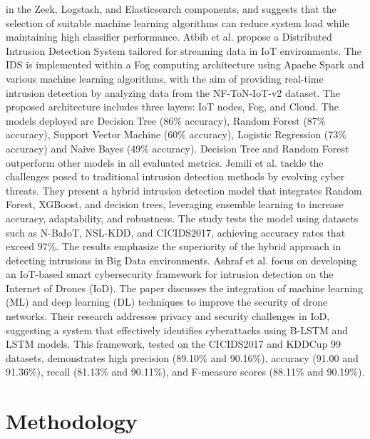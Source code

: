 \documentclass[runningheads]{llncs}
\begin{document}
in the Zeek, Logstash, and Elasticsearch components, and suggests that the selection of suitable machine learning algorithms can reduce system load while maintaining high classifier performance. Atbib et al. \cite{b9} propose a Distributed Intrusion Detection System tailored for streaming data in IoT environments. The IDS is implemented within a Fog computing architecture using Apache Spark and various machine learning algorithms, with the aim of providing real-time intrusion detection by analyzing data from the NF-ToN-IoT-v2 dataset. The proposed architecture includes three layers: IoT nodes, Fog, and Cloud. The models deployed are Decision Tree (86\% accuracy), Random Forest (87\% accuracy), Support Vector Machine (60\% accuracy), Logistic Regression (73\% accuracy) and Naive Bayes (49\% accuracy). Decision Tree and Random Forest outperform other models in all evaluated metrics. Jemili et al. \cite{b10} tackle the challenges posed to traditional intrusion detection methods by evolving cyber threats. They present a hybrid intrusion detection model that integrates Random Forest, XGBoost, and decision trees, leveraging ensemble learning to increase accuracy, adaptability, and robustness. The study tests the model using datasets such as N-BaIoT, NSL-KDD, and CICIDS2017, achieving accuracy rates that exceed 97\%. The results emphasize the superiority of the hybrid approach in detecting intrusions in Big Data environments. Ashraf et al. \cite{b11} focus on developing an IoT-based smart cybersecurity framework for intrusion detection on the Internet of Drones (IoD). The paper discusses the integration of machine learning (ML) and deep learning (DL) techniques to improve the security of drone networks. Their research addresses privacy and security challenges in IoD, suggesting a system that effectively identifies cyberattacks using B-LSTM and LSTM models. This framework, tested on the CICIDS2017 and KDDCup 99 datasets, demonstrates high precision (89.10\% and 90.16\%), accuracy (91.00 and 91.36\%), recall (81.13\% and 90.11\%), and F-measure scores (88.11\% and 90.19\%).
\section{Methodology}
\label{sec:Methodology}
\end{document}

